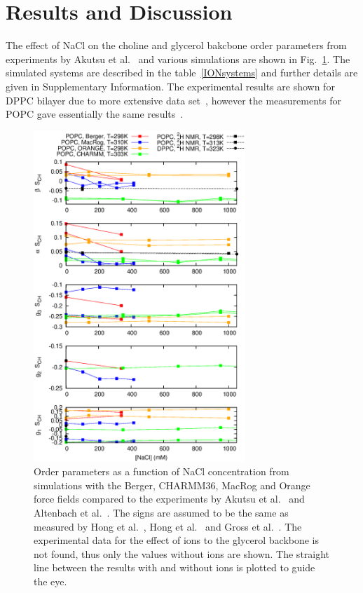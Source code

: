 \documentclass[pre,aps,floatfix,authordate1-4,twocolumn]{revtex4-1}
\begin{document}
\section{Results and Discussion}
The effect of NaCl on the choline and glycerol bakcbone order parameters from experiments by Akutsu et al.~\cite{akutsu81}
and various simulations are shown in Fig.~\ref{ordPnacl}. 
The simulated systems are described in the table~\ref{IONsystems} and further details are given in Supplementary Information. 
The experimental results are shown for DPPC bilayer due to more extensive data set~\cite{akutsu81}, 
however the measurements for POPC gave essentially the same results~\cite{altenbach84}.

\begin{figure}[]
  \centering
  \includegraphics[width=8cm]{../Fig/OrderParameterIONSnaclSIGN.eps}
  \caption{\label{ordPnacl}
    Order parameters as a function of NaCl concentration from simulations 
     with the Berger, CHARMM36, MacRog and Orange force fields compared to the experiments
     by Akutsu et al.~\cite{akutsu81} and Altenbach et al.~\cite{altenbach84}. The signs are assumed to be the same as measured by Hong et al.~\cite{hong95a}, Hong et al.~\cite{hong95a} and Gross et al.~\cite{gross97}. 
     The experimental data for the effect of ions to the glycerol backbone is not found, thus only the values without ions are shown. 
     The straight line between the results with and without ions is plotted to guide the eye. 
   }
\end{figure}
\end{document}
